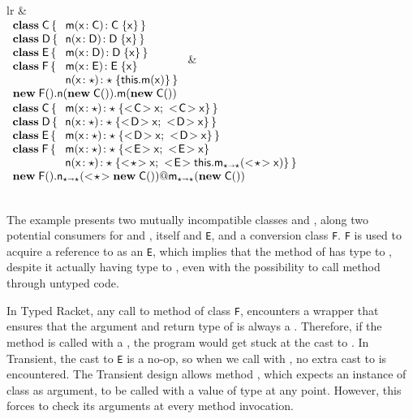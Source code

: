\documentclass[acmlarge, anonymous, authordraft, review]{acmart} %
\newcommand{\code}[1]{{\tt #1}\xspace}
\begin{document}
\newcommand{\sspce}{;~}
\newcommand{\idbody}[1]{\SubCast{#1}\x\sspce \SubCast{#1}\x}
\begin{tabular}{lr}
 &  \\
\(
\begin{array}{l@{\,}l}
\Class\C{}{&\Mdef\m\x\C\C\x} \\
\Class\D{}{&\Mdef{\xt n}\x\D\D\x} \\
\Class{\xt E}{}{&\Mdef\m\x\D\D\x} \\
\Class{\xt F}{}{&\Mdef\m\x{\xt E}{\xt E}\x \\
                &\Mdef\n\x\any\any{\Call\this\m\x}} \\
\multicolumn{2}{l}{\Call{\Call{\New{\xt F}{}}\n{\New\C{}}}\m{\New\C{}}}
\end{array}
\) &
\(
\begin{array}{l@{\,}l}
\Class\C{}{&\Mdef\m\x\any\any{\idbody\C}} \\
\Class\D{}{&\Mdef{\xt n}\x\any\any{\idbody\D}} \\
\Class{\xt E}{}{&\Mdef\m\x\any\any{\idbody\D}} \\
\Class{\xt F}{}{&\Mdef\m\x\any\any{\idbody{\xt E}} \\
                &\Mdef\n\x\any\any{\SubCast\any\x\sspce \SubCast{\xt E}{\KCall\this\m{\SubCast\any\x}\any\any}}} \\
\multicolumn{2}{l}{\DynCall{\KCall{\New{\xt F}{}}\n{\SubCast\any{\New\C{}}}\any\any}\m{\New\C{}}}
\end{array}
\)
\end{tabular} \\[1em]

The example presents two mutually incompatible classes \C and \D,
along two potential consumers for \C and \D, \C itself and \code E,
and a conversion class \code F. \code F is used to acquire a
reference to \C as an \code E, which implies that the method \m of \C has type \D to
\D, despite it actually having type \C to \C, even with the possibility to call
method \m through untyped code.

In Typed Racket, any call to method \m of class \code F, encounters a
wrapper that ensures that the argument and return type of \m is always a
\D. Therefore, if the method \m is called with a \C, the program would get
stuck at the cast to \D. In Transient, the cast to \code E is a no-op, so
when we call \m with \C, no extra cast to \D is encountered. The Transient
design allows method \m, which expects an instance of class \C as argument,
to be called with a value of type \any at any point. However, this forces \m
to check its arguments at every method invocation.
 
\end{document}
